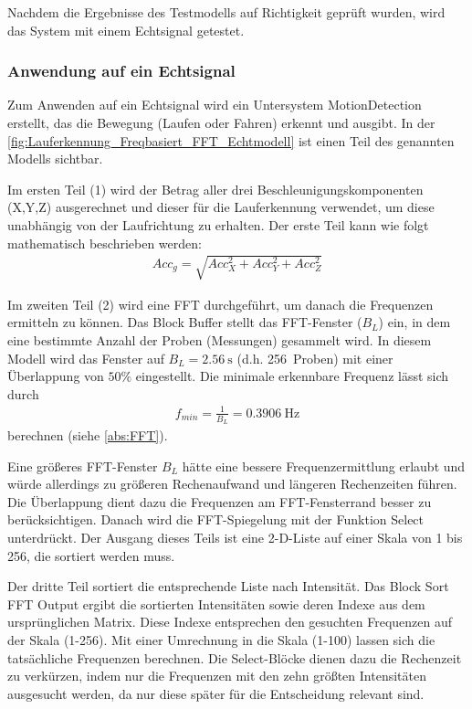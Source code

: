 Nachdem die Ergebnisse des Testmodells auf Richtigkeit geprüft wurden, wird das System mit einem Echtsignal getestet. 

\subsubsection{Anwendung auf ein Echtsignal}

Zum Anwenden auf ein Echtsignal wird ein Untersystem \glqq MotionDetection\grqq{} erstellt, das die Bewegung (Laufen oder Fahren) erkennt und ausgibt.
In der \autoref{fig:Lauferkennung_Freqbasiert_FFT_Echtmodell} ist einen Teil des genannten Modells sichtbar. 

Im ersten Teil (1) wird der Betrag aller drei Beschleunigungskomponenten (X,Y,Z) ausgerechnet und dieser für die Lauferkennung verwendet, um diese unabhängig von der Laufrichtung zu erhalten. Der erste Teil kann wie folgt mathematisch beschrieben werden:
\begin{align*}
	Acc_g = \sqrt{ Acc_X^2 + Acc_Y^2 + Acc_Z^2}
\end{align*}

Im zweiten Teil (2) wird eine FFT durchgeführt, um danach die Frequenzen ermitteln zu können. Das Block \glqq Buffer\grqq{} stellt das FFT-Fenster ($B_L$) ein, in dem eine bestimmte Anzahl der Proben (Messungen) gesammelt wird. In diesem Modell wird das Fenster auf $B_L = \SI{2,56}{\second}$ (d.h. \SI{256}{Proben}) mit einer Überlappung von $50\%$ eingestellt. Die minimale erkennbare Frequenz lässt sich durch
\begin{align*}
	f_{min} = \frac{1}{B_L} = \SI{0,3906}{\hertz}
\end{align*}
berechnen (siehe \autoref{abs:FFT}).

Eine größeres FFT-Fenster $B_L$ hätte eine bessere Frequenzermittlung erlaubt und würde allerdings zu größeren Rechenaufwand und längeren Rechenzeiten führen. Die Überlappung dient dazu die Frequenzen am FFT-Fensterrand besser zu berücksichtigen. Danach wird die FFT-Spiegelung mit der Funktion \glqq Select\grqq{} unterdrückt. Der Ausgang dieses Teils ist eine 2-D-Liste auf einer Skala von 1 bis 256, die sortiert werden muss.

Der dritte Teil sortiert die entsprechende Liste nach Intensität. Das Block \glqq Sort FFT Output\grqq{} ergibt die sortierten Intensitäten sowie deren Indexe aus dem ursprünglichen Matrix. Diese Indexe entsprechen den gesuchten Frequenzen auf der Skala (1-256). Mit einer Umrechnung in die Skala (1-100) lassen sich die tatsächliche Frequenzen berechnen. Die \glqq Select\grqq{}-Blöcke dienen dazu die Rechenzeit zu verkürzen, indem nur die Frequenzen mit den zehn größten Intensitäten ausgesucht werden, da nur diese später für die Entscheidung relevant sind.

